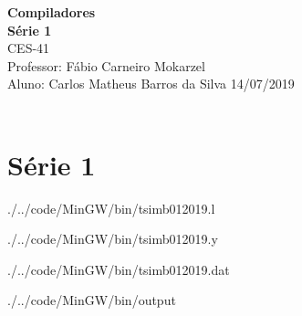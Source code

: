 \documentclass[a4paper, 9pt]{article}
\begin{document}
\noindent
\large\textbf{Compiladores} \\
\textbf{Série 1} \\
\normalsize CES-41  \\
Professor: Fábio Carneiro Mokarzel \\
Aluno: Carlos Matheus Barros da Silva \hfill 14/07/2019 \\ \\



\section*{Série 1}




{
./../code/MinGW/bin/tsimb012019.l
}


{
./../code/MinGW/bin/tsimb012019.y
}


{
./../code/MinGW/bin/tsimb012019.dat
}


{
./../code/MinGW/bin/output
}

\end{document}

